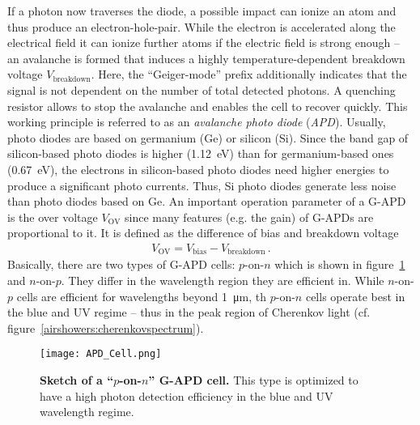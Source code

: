 If a photon now traverses the diode, a possible impact can ionize an atom and thus produce an electron-hole-pair. While the electron is accelerated along the electrical field it can ionize further atoms if the electric field is strong enough -- an avalanche is formed that induces a highly temperature-dependent breakdown voltage $V_\text{breakdown}$. Here, the \enquote{Geiger-mode} prefix additionally indicates that the signal is not dependent on the number of total detected photons. A quenching resistor allows to stop the avalanche and enables the cell to recover quickly. This working principle is referred to as an \textit{avalanche photo diode} (\textit{APD}). Usually, photo diodes are based on germanium (Ge) or silicon (Si). Since the band gap of silicon-based photo diodes is higher (\SI{1.12}{\electronvolt}) than for germanium-based ones (\SI{0.67}{\electronvolt}), the electrons in silicon-based photo diodes need higher energies to produce a significant photo currents. Thus, Si photo diodes generate less noise than photo diodes based on Ge. \cite{sipm:renker_lorenz} An important operation parameter of a G-APD is the over voltage $V_\text{OV}$ since many features (e.g. the gain) of G-APDs are proportional to it. It is defined as the difference of bias and breakdown voltage~\cite{sipm:renker_lorenz}
\begin{align}
	V_\text{OV} = V_\text{bias} - V_\text{breakdown}\,.
\end{align}
Basically, there are two types of G-APD cells: $p$-on-$n$ which is shown in figure~\ref{sipm:apd_cell} and $n$-on-$p$. They differ in the wavelength region they are efficient in. While $n$-on-$p$ cells are efficient for wavelengths beyond \SI{1}{\micro\meter}, th $p$-on-$n$ cells operate best in the blue and UV regime -- thus in the peak region of Cherenkov light (cf. figure~\ref{airshowers:cherenkovspectrum}).
\begin{figure}[H]
	\centering
	\texttt{[image: APD\_Cell.png]}
	\caption[Sketch of a \enquote{$p$-on-$n$} G-APD cell]{\textbf{Sketch of a \enquote{$p$-on-$n$} G-APD cell.} \cite{sipm:renker_lorenz} This type is optimized to have a high photon detection efficiency in the blue and UV wavelength regime.}
	\label{sipm:apd_cell}	
\end{figure}


